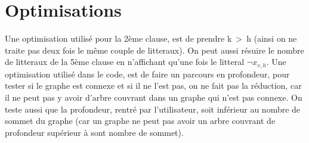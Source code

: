 \documentclass[10pt, a4paper]{article}
\begin{document}
\section {Optimisations}
Une optimisation utilisé pour la 2ème clause, est de prendre k~>~h (ainsi on ne traite pas deux fois le même couple de litteraux). On peut aussi résuire le nombre de litteraux de la 5ème clause en n'affichant qu'une fois le litteral $\neg x_{v,h}$.\newline
Une optimisation utilisé dans le code, est de faire un parcours en profondeur, pour tester si le graphe est connexe et si il ne l'est pas, on ne fait pas la réduction, car il ne peut pas y avoir d'arbre couvrant dans un graphe qui n'est pas connexe.
On teste aussi que la profondeur, rentré par l'utilisateur, soit inférieur au nombre de sommet du graphe (car un graphe ne peut pas avoir un arbre couvrant de profondeur supérieur à sont nombre de sommet).
\end{document}
